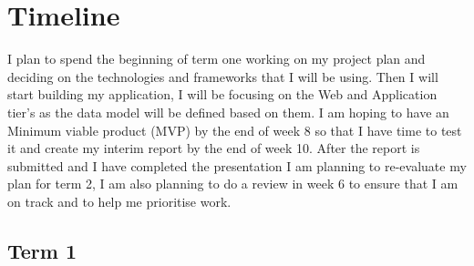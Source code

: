 \documentclass[]{project_report}
\begin{document}
\newpage

\chapter{Timeline}


I plan to spend the beginning of term one working on my project plan and deciding on the technologies and frameworks that I will be using. Then I will start building my application, I will be focusing on the Web and Application tier's as the data model will be defined based on them. I am hoping to have an Minimum viable product (MVP) by the end of week 8 so that I have time to test it and create my interim report by the end of week 10. After the report is submitted and I have completed the presentation I am planning to re-evaluate my plan for term 2, I am also planning to do a review in week 6 to ensure that I am on track and to help me prioritise work.


 

\section{Term 1}
\end{document}
